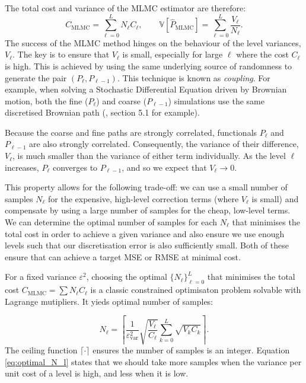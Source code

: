The total cost and variance of the MLMC estimator are therefore:
$$
C_{\mathrm{MLMC}} = \sum_{\ell=0}^L N_\ell C_\ell, \qquad 
\mathbb{V}[\hat{P}_{\mathrm{MLMC}}] = \sum_{\ell=0}^L \frac{V_\ell}{N_\ell}.
$$
The success of the MLMC method hinges on the behaviour of the level variances, 
$V_\ell$. The key is to ensure that $V_\ell$ is small, especially for large $\ell$ where
the cost $C_\ell$ is high. This is achieved by using the same underlying source of 
randomness to generate the pair $(P_\ell, P_{\ell-1})$. This technique is known as
\textit{coupling}. For example, when solving a Stochastic Differential Equation 
driven by Brownian motion,
both the fine ($P_\ell$) and coarse ($P_{\ell - 1}$) simulations use the same discretised Brownian path 
(\cite{giles2015multilevel}, section 5.1 for example). 

Because the coarse and fine paths are strongly correlated, 
functionals $P_\ell$ and $P_{\ell-1}$ are also strongly correlated. 
Consequently, the variance of their difference, $V_\ell$, is much smaller 
than the variance of either term individually. As the level $\ell$ increases, 
$P_\ell$ converges to $P_{\ell-1}$, and so we expect that $V_\ell \to 0$.

This property allows for the following trade-off: we can use a small number of samples $N_\ell$ 
for the expensive, high-level correction terms (where $V_\ell$ is small) and compensate 
by using a large number of samples for the cheap, low-level terms. We can determine the 
optimal number of samples for each $N_\ell$ that minimises the total cost in order 
to achieve a given variance and also ensure we use enough levels such that our discretisation error 
is also sufficiently small. Both of these ensure that can achieve a target MSE or RMSE at minimal cost.

For a fixed variance $\varepsilon^2$, choosing the optimal $\{N_\ell\}_{\ell=0}^L$ that 
minimises the total cost $C_{\textrm{MLMC}} = \sum N_\ell C_\ell$ is a classic 
constrained optimisaton problem solvable with Lagrange mutipliers. It yieds 
optimal number of samples:

\begin{equation}\label{eq:optimal_N_l}
    N_\ell = \left\lceil \frac{1}{\varepsilon_{\text{var}}^2} \sqrt{\frac{V_\ell}{C_\ell}} \sum_{k=0}^L \sqrt{V_k C_k} \right\rceil.
\end{equation}
The ceiling function $\lceil \cdot \rceil$ ensures the number of samples is an integer.
Equation \eqref{eq:optimal_N_l} states that we should take more samples when the 
variance per unit cost of a level is high, and less when it is low.


